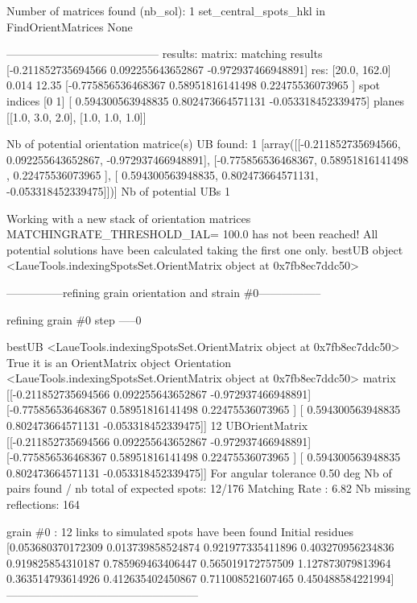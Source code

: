\documentclass[letterpaper,10pt,english]{sphinxmanual}
\begin{document}
\begin{sphinxalltt}
Number of matrices found (nb\_sol):  1
set\_central\_spots\_hkl in FindOrientMatrices None

-----------------------------------------
results:
matrix:                                         matching results
{[}-0.211852735694566  0.092255643652867 -0.972937466948891{]}        res: {[}20.0, 162.0{]} 0.014 12.35
{[}-0.775856536468367  0.58951816141498   0.22475536073965 {]}        spot indices {[}0 1{]}
{[} 0.594300563948835  0.802473664571131 -0.053318452339475{]}        planes {[}{[}1.0, 3.0, 2.0{]}, {[}1.0, 1.0, 1.0{]}{]}

Nb of potential orientation matrice(s) UB found: 1
{[}array({[}{[}-0.211852735694566,  0.092255643652867, -0.972937466948891{]},
       {[}-0.775856536468367,  0.58951816141498 ,  0.22475536073965 {]},
       {[} 0.594300563948835,  0.802473664571131, -0.053318452339475{]}{]}){]}
Nb of potential UBs  1

Working with a new stack of orientation matrices
MATCHINGRATE\_THRESHOLD\_IAL= 100.0
has not been reached! All potential solutions have been calculated
taking the first one only.
bestUB object \textless{}LaueTools.indexingSpotsSet.OrientMatrix object at 0x7fb8ec7ddc50\textgreater{}


---------------refining grain orientation and strain \#0-----------------


 refining grain \#0 step -----0

bestUB \textless{}LaueTools.indexingSpotsSet.OrientMatrix object at 0x7fb8ec7ddc50\textgreater{}
True it is an OrientMatrix object
Orientation \textless{}LaueTools.indexingSpotsSet.OrientMatrix object at 0x7fb8ec7ddc50\textgreater{}
matrix {[}{[}-0.211852735694566  0.092255643652867 -0.972937466948891{]}
 {[}-0.775856536468367  0.58951816141498   0.22475536073965 {]}
 {[} 0.594300563948835  0.802473664571131 -0.053318452339475{]}{]}
 12
UBOrientMatrix {[}{[}-0.211852735694566  0.092255643652867 -0.972937466948891{]}
 {[}-0.775856536468367  0.58951816141498   0.22475536073965 {]}
 {[} 0.594300563948835  0.802473664571131 -0.053318452339475{]}{]}
For angular tolerance 0.50 deg
Nb of pairs found / nb total of expected spots: 12/176
Matching Rate : 6.82
Nb missing reflections: 164

grain \#0 : 12 links to simulated spots have been found
Initial residues {[}0.053680370172309 0.013739858524874 0.921977335411896 0.403270956234836
 0.919825854310187 0.785969463406447 0.565019172757509 1.127873079813964
 0.363514793614926 0.412635402450867 0.711008521607465 0.450488584221994{]}
---------------------------------------------------




\end{sphinxalltt}
\end{document}
